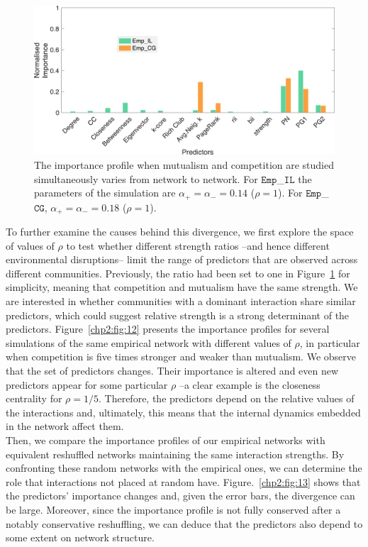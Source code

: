 \begin{figure}[t]
    \centering
    \includegraphics[width=1.05\textwidth]{figures/chp2/fig_11.pdf}
    \caption[Importance profile with several types of interactions at the same time]{The importance profile when mutualism and competition are studied simultaneously varies from network to network. For $\texttt{Emp}$\_$\texttt{IL}$ the parameters of the simulation are $\alpha_+ = \alpha_- = 0.14$ ($\rho = 1$). For $\texttt{Emp}$\_$\texttt{CG}$, $\alpha_+ = \alpha_-  = 0.18$ ($\rho = 1$).}
    \label{chp2:fig:11}
\end{figure}

To further examine the causes behind this divergence, we first explore the space of values of $\rho$ to test whether different strength ratios --and hence different environmental disruptions-- limit the range of predictors that are observed across different communities. Previously, the ratio had been set to one in Figure~\ref{chp2:fig:11} for simplicity, meaning that competition and mutualism have the same strength. We are interested in whether communities with a dominant interaction share similar predictors, which could suggest relative strength is a strong determinant of the predictors. Figure~\ref{chp2:fig:12} presents the importance profiles for several simulations of the same empirical network with different values of $\rho$, in particular when competition is five times stronger and weaker than mutualism. We observe that the set of predictors changes. Their importance is altered and even new predictors appear for some particular $\rho$ --a clear example is the closeness centrality for $\rho = 1/5$. Therefore, the predictors depend on the relative values of the interactions and, ultimately, this means that the internal dynamics embedded in the network affect them. \\

Then, we compare the importance profiles of our empirical networks with equivalent reshuffled networks maintaining the same interaction strengths. By confronting these random networks with the empirical ones, we can determine the role that interactions not placed at random have. Figure.~\ref{chp2:fig:13} shows that the predictors' importance changes and, given the error bars, the divergence can be large. Moreover, since the importance profile is not fully conserved after a notably conservative reshuffling, we can deduce that the predictors also depend to some extent on network structure. \\

